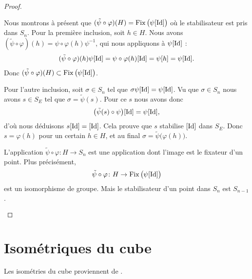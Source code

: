 \begin{proof}
\begin{subproof}
\begin{subproof}
                \item[Fixateur]

                    Nous montrons à présent que \( (\tilde \psi\circ\varphi)(H)=\operatorname{Fix}\big( \psi[\operatorname{Id}] \big)\) où le stabilisateur est pris dans \( S_n\). Pour la première inclusion, soit \( h\in H\). Nous avons \( (\tilde \psi\circ\varphi)(h)=\psi\circ\varphi(h)\psi^{-1}\), qui nous appliquons à \( \psi[\operatorname{Id}]\) :
                    \begin{equation}
                        (\tilde \psi\circ\varphi)(h)\psi[\operatorname{Id}]=\psi\circ\varphi(h)[\operatorname{Id}]=\psi[h]=\psi[\operatorname{Id}].
                    \end{equation}
                    Donc \( (\tilde \psi\circ\varphi)(H)\subset\operatorname{Fix}\big( \psi[\operatorname{Id}] \big)\).

                    Pour l'autre inclusion, soit \( \sigma\in S_n\) tel que \( \sigma\psi[\operatorname{Id}]=\psi[\operatorname{Id}]\). Vu que \( \sigma\in S_n\) nous avons \( s\in S_E\) tel que \( \sigma=\tilde \psi(s)\). Pour ce \( s\) nous avons donc
                    \begin{equation}
                        \big( \tilde \psi(s)\circ\psi \big)[\operatorname{Id}]=\psi[\operatorname{Id}],
                    \end{equation}
                    d'où nous déduisons \( s[\operatorname{Id}]=[\operatorname{Id}]\). Cela prouve que \( s\) stabilise \( [\operatorname{Id}]\) dans \( S_E\). Donc \( s=\varphi(h)\) pour un certain \( h\in H\), et au final \( \sigma=\tilde \psi\big( \varphi(h) \big)\).

                \item[Conclusion]

                    L'application \( \tilde \psi\circ\varphi\colon H\to S_n\) est une application dont l'image est le fixateur d'un point. Plus précisément,
                    \begin{equation}
                        \tilde \psi\circ\varphi\colon H\to \operatorname{Fix}\big( \psi[\operatorname{Id}] \big)
                    \end{equation}
                    est un isomorphisme de groupe. Mais le stabilisateur d'un point dans \( S_n\) est \( S_{n-1}\).
            \end{subproof}
    \end{subproof}
\end{proof}


\section{Isométriques du cube}
\label{SecPVCmkxM}
Les isométries du cube proviennent de \cite{KXjFWKA}.

